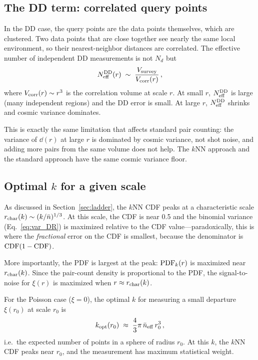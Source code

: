 \subsection{The DD term: correlated query points}
\label{sec:dd_error}

In the DD case, the query points are the data points themselves, which are clustered.  Two data points that are close together see nearly the same local environment, so their nearest-neighbor distances are correlated.  The effective number of independent DD measurements is not $N_d$ but
\begin{equation}
  N_{\rm eff}^{\mathrm{DD}}(r) \;\sim\; \frac{V_{\rm survey}}{V_{\rm corr}(r)}\,,
  \label{eq:N_eff_DD}
\end{equation}
where $V_{\rm corr}(r) \sim r^3$ is the correlation volume at scale $r$.  At small $r$, $N_{\rm eff}^{\mathrm{DD}}$ is large (many independent regions) and the DD error is small.  At large $r$, $N_{\rm eff}^{\mathrm{DD}}$ shrinks and cosmic variance dominates.

This is exactly the same limitation that affects standard pair counting: the variance of $\dd(r)$ at large $r$ is dominated by cosmic variance, not shot noise, and adding more pairs from the same volume does not help.  The $k$NN approach and the standard approach have the same cosmic variance floor.

\subsection{Optimal $k$ for a given scale}
\label{sec:optimal_k}

As discussed in Section~\ref{sec:ladder}, the $k$NN CDF peaks at a characteristic scale $r_{\rm char}(k) \sim (k/\bar{n})^{1/3}$.  At this scale, the CDF is near 0.5 and the binomial variance (Eq.~\ref{eq:var_DR}) is maximized relative to the CDF value---paradoxically, this is where the \emph{fractional} error on the CDF is smallest, because the denominator is $\mathrm{CDF}(1-\mathrm{CDF})$.

More importantly, the PDF is largest at the peak: $\mathrm{PDF}_k(r)$ is maximized near $r_{\rm char}(k)$.  Since the pair-count density is proportional to the PDF, the signal-to-noise for $\xi(r)$ is maximized when $r \approx r_{\rm char}(k)$.

For the Poisson case ($\xi = 0$), the optimal $k$ for measuring a small departure $\xi(r_0)$ at scale $r_0$ is
\begin{equation}
  k_{\rm opt}(r_0) \;\approx\; \frac{4}{3}\pi\,\bar{n}_{\rm eff}\,r_0^3\,,
  \label{eq:k_opt}
\end{equation}
i.e.\ the expected number of points in a sphere of radius $r_0$.  At this $k$, the $k$NN CDF peaks near $r_0$, and the measurement has maximum statistical weight.

